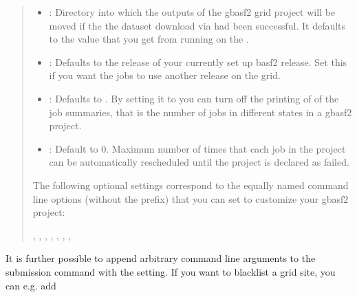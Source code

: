 \documentclass[letterpaper,10pt,english]{sphinxmanual}
\begin{document}
\begin{fulllineitems}
\begin{description}
\begin{quote}
\begin{itemize}
\item {} 
: Directory into which the outputs of the gbasf2 grid project will be moved
if the the dataset download via  had been successful. It defaults to the value that you
get from running  on the .

\item {} 
: Defaults to the release of your currently set up basf2 release.
Set this if you want the jobs to use another release on the grid.

\item {} 
: Defaults to . By setting it to  you can turn off the
printing of of the job summaries, that is the number of jobs in different states in a gbasf2 project.

\item {} 
: Default to 0. Maximum number of times that each job in the project can be automatically
rescheduled until the project is declared as failed.

\end{itemize}

The following optional settings correspond to the equally named  command line options
(without the  prefix) that you can set to customize your gbasf2 project:

,
,
,
,
,
,
,
\end{quote}

It is further possible to append arbitrary command line arguments to the  submission command
with the  setting.
If you want to blacklist a grid site, you can e.g. add

\begin{sphinxVerbatim}[commandchars=\\\{\}]
  
\end{sphinxVerbatim}


\end{description}
\end{fulllineitems}
\end{document}
